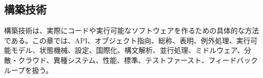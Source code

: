 \subsection{構築技術}

構築技術は、実際にコードや実行可能なソフトウェアを作るための具体的な方法である。この章では、API、オブジェクト指向、総称、表明、例外処理、実行可能モデル、状態機械、設定、国際化、構文解析、並行処理、ミドルウェア、分散・クラウド、異種システム、性能、標準、テストファースト、フィードバックループを扱う。
